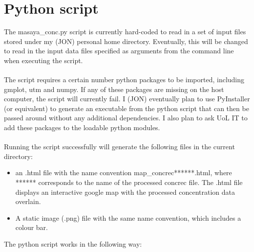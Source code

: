 \documentclass[10pt,a4paper]{article}
\begin{document}
\section{Python script}
The masaya\_conc.py script is currently hard-coded to read in a set of input files stored under my (JON) personal home directory. Eventually, this will be changed to read in the input data files specified as arguments from the command line when executing the script.\\\\
The script requires a certain number python packages to be imported, including gmplot, utm and numpy. If any of these packages are missing on the host computer, the script will currently fail. I (JON) eventually plan to use PyInstaller (or equivalent) to generate an executable from the python script that can then be passed around without any additional dependencies. I also plan to ask UoL IT to add these packages to the loadable python modules.\\\\
Running the script successfully will generate the following files in the current directory:
\begin{itemize}
\item an .html file with the name convention map\_concrec******.html, where ****** corresponds to the name of the processed concrec file. The .html file displays an interactive google map with the processed concentration data overlain.
\item A static image (.png) file with the same name convention, which includes a colour bar.
\end{itemize}
The python script works in the following way:
\end{document}
